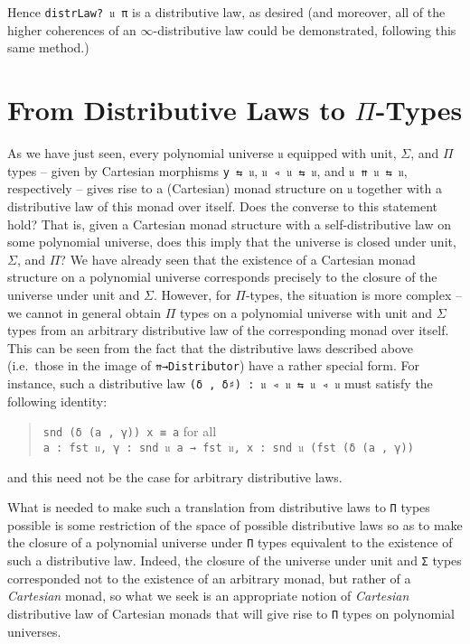 \documentclass[
  11pt,
  oneside,
  article]{memoir}
\theoremstyle{definition}
\theoremstyle{plain}
\newcommand{\0}{\textsf{0}}
\newcommand{\1}{\tn{\textsf{1}}}
\begin{document}
Hence \texttt{distrLaw?\ 𝔲\ π} is a distributive law, as desired (and
moreover, all of the higher coherences of an \(\infty\)-distributive law
could be demonstrated, following this same method.)

\section{\texorpdfstring{From Distributive Laws to
\(\Pi\)-Types}{From Distributive Laws to \textbackslash Pi-Types}}\label{from-distributive-laws-to-pi-types}

As we have just seen, every polynomial universe \texttt{𝔲} equipped with
unit, \(\Sigma\), and \(\Pi\) types -- given by Cartesian morphisms
\texttt{y\ ⇆\ 𝔲}, \texttt{𝔲\ ◃\ 𝔲\ ⇆\ 𝔲}, and \texttt{𝔲\ ⇈\ 𝔲\ ⇆\ 𝔲},
respectively -- gives rise to a (Cartesian) monad structure on
\texttt{𝔲} together with a distributive law of this monad over itself.
Does the converse to this statement hold? That is, given a Cartesian
monad structure with a self-distributive law on some polynomial
universe, does this imply that the universe is closed under unit,
\(\Sigma\), and \(\Pi\)? We have already seen that the existence of a
Cartesian monad structure on a polynomial universe corresponds precisely
to the closure of the universe under unit and \(\Sigma\). However, for
\(\Pi\)-types, the situation is more complex -- we cannot in general
obtain \(\Pi\) types on a polynomial universe with unit and \(\Sigma\)
types from an arbitrary distributive law of the corresponding monad over
itself. This can be seen from the fact that the distributive laws
described above (i.e.~those in the image of \texttt{⇈→Distributor}) have
a rather special form. For instance, such a distributive law
\texttt{(δ\ ,\ δ♯)\ :\ 𝔲\ ◃\ 𝔲\ ⇆\ 𝔲\ ◃\ 𝔲} must satisfy the following
identity:

\begin{quote}
\texttt{snd\ (δ\ (a\ ,\ γ))\ x\ ≡\ a} for all
\texttt{a\ :\ fst\ 𝔲,\ γ\ :\ snd\ 𝔲\ a\ →\ fst\ 𝔲,\ x\ :\ snd\ 𝔲\ (fst\ (δ\ (a\ ,\ γ))}
\end{quote}

\noindent and this need not be the case for arbitrary distributive laws.

What is needed to make such a translation from distributive laws to
\texttt{Π} types possible is some restriction of the space of possible
distributive laws so as to make the closure of a polynomial universe
under \texttt{Π} types equivalent to the existence of such a
distributive law. Indeed, the closure of the universe under unit and
\texttt{Σ} types corresponded not to the existence of an arbitrary
monad, but rather of a \emph{Cartesian} monad, so what we seek is an
appropriate notion of \emph{Cartesian} distributive law of Cartesian
monads that will give rise to \texttt{Π} types on polynomial universes.
\end{document}
